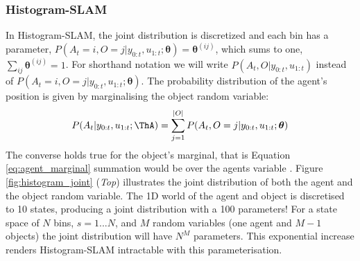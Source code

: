 \subsubsection{Histogram-SLAM}\label{sec:Discrete}

In Histogram-SLAM, the joint distribution is discretized and each bin has a parameter, 
${P(A_t=i,O=j|y_{0:t},u_{1:t};\boldsymbol{\theta}) = \boldsymbol{\theta}^{(ij)}}$, which sums to one, ${\sum_{ij} \boldsymbol{\theta}^{(ij)} = 1}$. 
For shorthand notation we will write ${P(A_t,O|y_{0:t},u_{1:t})}$ instead of ${P(A_t=i,O=j|y_{0:t},u_{1:t};\boldsymbol{\theta})}$. The probability distribution of the agent's 
position is given by marginalising the object random variable:
\begin{equation}
 P(A_t|y_{0:t},u_{1:t};\ThA)    = \sum\limits_{j=1}^{|O|} P(A_t,O=j|y_{0:t},u_{1:t};\boldsymbol{\theta}) \label{eq:agent_marginal}
\end{equation}
The converse holds true for the object's marginal, that is Equation \ref{eq:agent_marginal} summation would be over 
the agents variable . Figure \ref{fig:histogram_joint} (\textit{Top}) illustrates the joint distribution of both the agent and the object random variable. 
The 1D world of the agent and object is discretised to 10 states, producing a joint distribution with a 100 parameters!
For a state space of $N$ bins, $s=1...N$, and $M$ random variables (one agent and $M-1$ objects)
the joint distribution will have $N^{M}$ parameters. This exponential increase renders Histogram-SLAM intractable
with this parameterisation.

